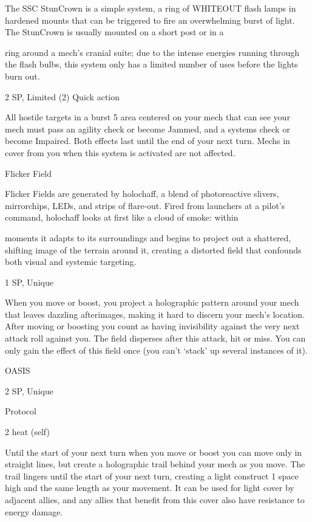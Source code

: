 The SSC StunCrown is a simple system, a ring of WHITEOUT flash lamps in hardened mounts that can be  
triggered to fire an overwhelming burst of light. The StunCrown is usually mounted on a short post or in a  

ring around a mech’s cranial suite; due to the intense energies running through the flash bulbs, this system  
only has a limited number of uses before the lights burn out.   

2 SP, Limited (2)  
Quick action  

All hostile targets in a burst 5 area centered on your mech that can see your mech must pass an  
agility check or become Jammed, and a systems check or become Impaired. Both effects last  
until the end of your next turn. Mechs in cover from you when this system is activated are not  
affected. 
 

Flicker Field  

Flicker Fields are generated by holochaff, a blend of photoreactive slivers, mirrorchips, LEDs, and strips of  
flare-out. Fired from launchers at a pilot’s command, holochaff looks at first like a cloud of smoke: within  

moments it adapts to its surroundings and begins to project out a shattered, shifting image of the terrain  
around it, creating a distorted field that confounds both visual and systemic targeting.     

1 SP, Unique
 
When you move or boost, you project a holographic pattern around your mech that leaves  
dazzling afterimages, making it hard to discern your mech’s location. After moving or boosting  
you count as having invisibility against the very next attack roll against you. The field disperses  
after this attack, hit or miss. You can only gain the effect of this field once (you can’t ‘stack’ up  
several instances of it).
 

OASIS  

2 SP, Unique
 
Protocol
 
2 heat (self)
 
Until the start of your next turn when you move or boost you can move only in straight lines, but  
create a holographic trail behind your mech as you move. The trail lingers until the start of your  
next turn, creating a light construct 1 space high and the same length as your movement. It can  
be used for light cover by adjacent allies, and any allies that benefit from this cover also have  
resistance to energy damage.
 

